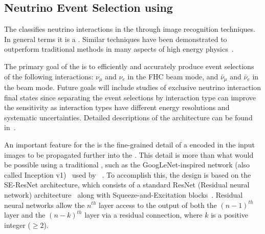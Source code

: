 
\subsection{Neutrino Event Selection using }
The   classifies neutrino interactions in the   through image recognition techniques. In general terms it is a . Similar techniques have been demonstrated to outperform traditional methods in many aspects of high energy physics~\cite{Radovic:2018dip}.

The primary goal of the  is to efficiently and accurately produce event selections of the following interactions: $\nu_{\mu}$  and $\nu_{e}$  in the FHC beam mode, and $\bar{\nu}_\mu$  and $\bar{\nu}_e$  in the  beam mode. Future goals will include studies of exclusive neutrino interaction final states since separating the event selections by interaction type can improve the sensitivity as interaction types have different energy resolutions and systematic uncertainties. Detailed descriptions of the  architecture can be found in~\cite{Aurisano:2016jvx}.

An important feature for the   is the fine-grained detail of a  encoded in the input images to be propagated further into the . This detail is more than what would be possible using a traditional , such as the GoogLeNet-inspired network (also called Inception v1)~\cite{GoogLeNet} used by ~\cite{Aurisano:2016jvx}. To accomplish this, the  design is based on the SE-ResNet architecture, which consists of a standard ResNet (Residual neural network) architecture~\cite{He-et-al-2015-deep} along with Squeeze-and-Excitation blocks~\cite{Hu-et-al-2017-squeeze}. Residual neural networks allow the $n^{th}$ layer access to the output of both the $(n-1)^{th}$ layer and the $(n-k)^{th}$ layer via a residual connection, where $k$ is a positive integer ($\ge 2$).

